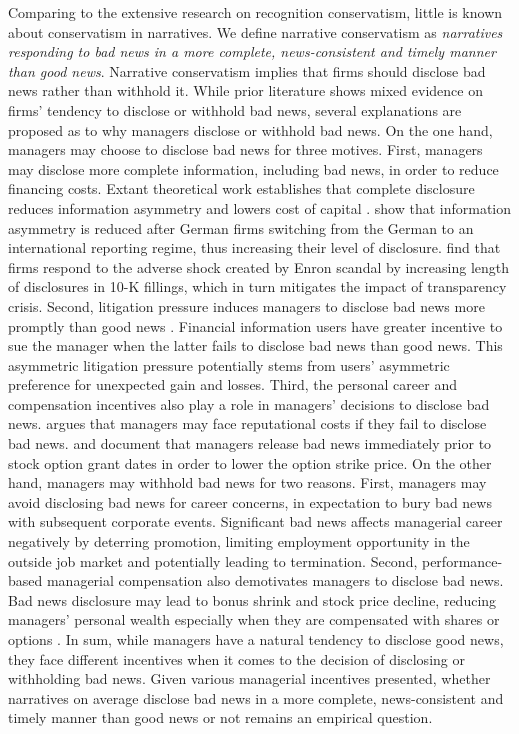 \documentclass[a4paper]{article}
\begin{document}
\begin{spacing}{2}
Comparing to the extensive research on recognition conservatism, little is known about conservatism in narratives. We define narrative conservatism as \textit{narratives responding to bad news in a more complete, news-consistent and timely manner than good news}. Narrative conservatism implies that firms should disclose bad news rather than withhold it. While prior literature shows mixed evidence on firms' tendency to disclose or withhold bad news, several explanations are proposed as to why managers disclose or withhold bad news. On the one hand, managers may choose to disclose bad news for three motives. First, managers may disclose more complete information, including bad news, in order to reduce financing costs. Extant theoretical work establishes that complete disclosure reduces information asymmetry and lowers cost of capital \citep[e.g.,][]{diamondDisclosureLiquidityCost1991, baimanRelationCapitalMarkets1996}. \citet*{leuzEconomicConsequencesIncreased2000} show that information asymmetry is reduced after German firms switching from the German to an international reporting regime, thus increasing their level of disclosure. \cite{leuzDisclosureCostCapital2009} find that firms respond to the adverse shock created by Enron scandal by increasing length of disclosures in 10-K fillings, which in turn mitigates the impact of transparency crisis. Second, litigation pressure induces managers to disclose bad news more promptly than good news \citep*{skinnerWhyFirmsVoluntarily1994, skinnerEarningsDisclosuresStockholder1997, kasznikWarnNotWarn1995}. Financial information users have greater incentive to sue the manager when the latter fails to disclose bad news than good news. This asymmetric litigation pressure potentially stems from users' asymmetric preference for unexpected gain and losses. Third, the personal career and compensation incentives also play a role in managers' decisions to disclose bad news. \citet{skinnerWhyFirmsVoluntarily1994} argues that managers may face reputational costs if they fail to disclose bad news. \citet*{yermackGoodTimingCEO1997} and \citet*{aboodyCEOStockOption2000} document that managers release bad news immediately prior to stock option grant dates in order to lower the option strike price. On the other hand, managers may withhold bad news for two reasons. First, managers may avoid disclosing bad news for career concerns, in expectation to bury bad news with subsequent corporate events. Significant bad news affects managerial career negatively by deterring promotion, limiting employment opportunity in the outside job market and potentially leading to termination. Second, performance-based managerial compensation also demotivates managers to disclose bad news. Bad news disclosure may lead to bonus shrink and stock price decline, reducing managers' personal wealth especially when they are compensated with shares or options \citep{kothariManagersWithholdBad2009}. In sum, while managers have a natural tendency to disclose good news, they face different incentives when it comes to the decision of disclosing or withholding bad news. Given various managerial incentives presented, whether narratives on average disclose bad news in a more complete, news-consistent and timely manner than good news or not remains an empirical question.


\end{spacing}
\end{document}
